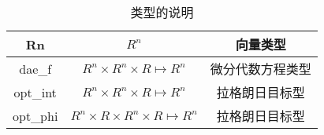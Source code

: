 \documentclass[a4]{ctexart}
\begin{document}
\begin{table}[h]
\centering  %
\caption{类型的说明}  %
\label{table1}  %
\begin{tabular}{|c|c|c|} 
\hline
Rn     &    $R^n$     &           向量类型  \\
\hline
dae\_f &   $R^n\times R^n\times R \mapsto R^n$ & 微分代数方程类型\\
 \hline
  opt\_int & $R^n\times R^n\times R\mapsto R^n$  & 拉格朗日目标型\\
 \hline
 opt\_phi   & $ R^n\times R\times R^n\times R\mapsto R^n$  & 拉格朗日目标型\\
 \hline
\end{tabular}
\end{table}
\end{document}
